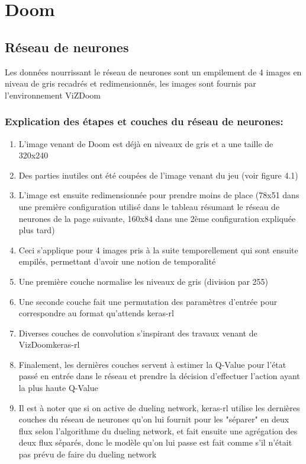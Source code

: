 \documentclass[a4paper,10pt,openany,oneside]{report}
\begin{document}
\section{Doom}
\subsection{Réseau de neurones}
Les données nourrissant le réseau de neurones sont un empilement de 4 images en niveau de gris recadrés et redimensionnés, les images sont fournis par l'environnement ViZDoom

\subsubsection*{Explication des étapes et couches du réseau de neurones:}
\begin{enumerate}
	\item L'image venant de Doom est déjà en niveaux de gris et a une taille de 320x240
	\item Des parties inutiles ont été coupées de l'image venant du jeu (voir figure 4.1)
	\item L'image est ensuite redimensionnée pour prendre moins de place (78x51 dans une première configuration utilisé dans le tableau résumant le réseau de neurones de la page suivante, 160x84 dans une 2ème configuration expliquée plus tard)
	\item Ceci s'applique pour 4 images pris à la suite temporellement qui sont ensuite empilés, permettant d'avoir une notion de temporalité
	\item Une première couche normalise les niveaux de gris (division par 255)
	\item Une seconde couche fait une permutation des paramètres d'entrée pour correspondre au format qu'attends keras-rl
	\item Diverses couches de convolution s'inspirant des travaux venant de VizDoomkeras-rl \cite[]{vizDoomkeras-rl}
	\item Finalement, les dernières couches servent à estimer la Q-Value pour l'état passé en entrée dans le réseau et prendre la décision d'effectuer l'action ayant la plus haute Q-Value
	\item Il est à noter que si on active de dueling network, keras-rl utilise les dernières couches du réseau de neurones qu'on lui fournit pour les "séparer" en deux flux selon l'algorithme du dueling network, et fait ensuite une agrégation des deux flux séparés, donc le modèle qu'on lui passe est fait comme s'il n'était pas prévu de faire du dueling network
\end{enumerate}
\end{document}
